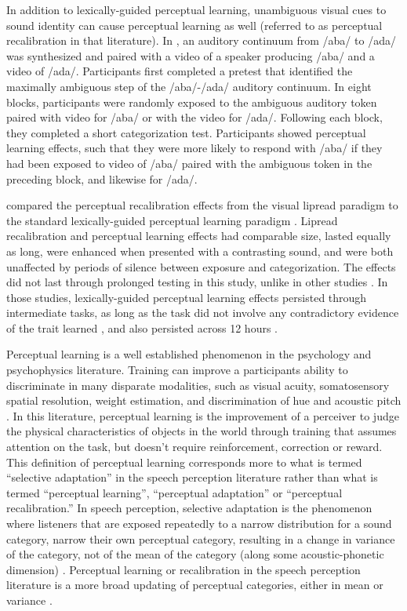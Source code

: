 In addition to lexically-guided perceptual learning, unambiguous visual cues to sound identity can cause perceptual learning as well (referred to as perceptual recalibration in that literature).
In \citet{Bertelson2003}, an auditory continuum from /aba/ to /ada/ was synthesized and paired with a video of a speaker producing /aba/ and a video of /ada/.  
Participants first completed a pretest that identified the maximally ambiguous step of the /aba/-/ada/ auditory continuum. 
 In eight blocks, participants were randomly exposed to the ambiguous auditory token paired with video for /aba/ or with the video for /ada/.  Following each block, they completed a short categorization test.  
Participants showed perceptual learning effects, such that they were more likely to respond with /aba/ if they had been exposed to video of /aba/ paired with the ambiguous token in the preceding block, and likewise for /ada/.

\citet{vanLinden2007} compared the perceptual recalibration effects from the visual lipread paradigm \citep{Bertelson2003} to the standard lexically-guided perceptual learning paradigm \citep{Norris2003}.  
Lipread recalibration and perceptual learning effects had comparable size, lasted equally as long, were enhanced when presented with a contrasting sound, and were both unaffected by periods of silence between exposure and categorization.  
The effects did not last through prolonged testing in this study, unlike in other studies \citep{Kraljic2005,Eisner2006}.
In those studies, lexically-guided perceptual learning effects persisted through intermediate tasks, as long as the task did not involve any contradictory evidence of the trait learned \citep{Kraljic2005}, and also persisted across 12 hours \citep{Eisner2006}.

Perceptual learning is a well established phenomenon in the psychology and psychophysics literature. 
Training can improve a participants ability to discriminate in many disparate modalities, such as visual acuity, somatosensory spatial resolution, weight estimation, and discrimination of hue and acoustic pitch \citep[for review]{Gibson1953}. 
In this literature, perceptual learning is the improvement of a perceiver to judge the physical characteristics of objects in the world through training that assumes attention on the task, but doesn't require reinforcement, correction or reward.
This definition of perceptual learning corresponds more to what is termed ``selective adaptation'' in the speech perception literature rather than what is termed ``perceptual learning'', ``perceptual adaptation'' or ``perceptual recalibration.''  
In speech perception, selective adaptation is the phenomenon where listeners that are exposed repeatedly to a narrow distribution for a sound category, narrow their own perceptual category, resulting in a change in variance of the category, not of the mean of the category (along some acoustic-phonetic dimension) \citep{Eimas1973,Samuel1986,Vroomen2007}.
Perceptual learning or recalibration in the speech perception literature is a more broad updating of perceptual categories, either in mean or variance \citep{Norris2003, Vroomen2007}.

